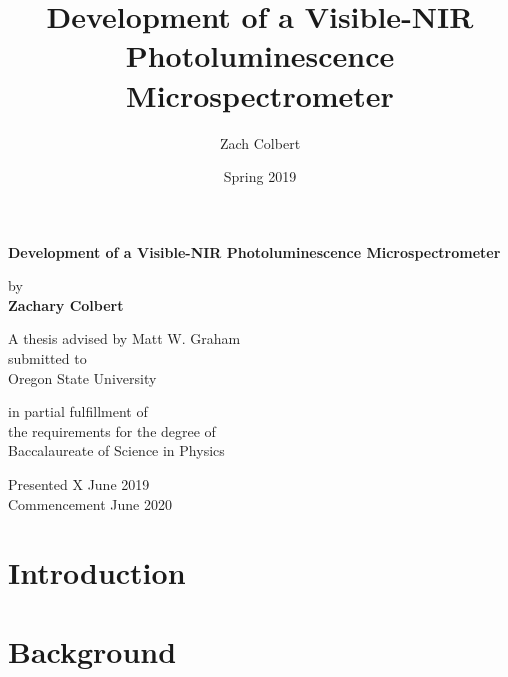 \documentclass{report}
\title{Development of a Visible-NIR Photoluminescence Microspectrometer}
\author{Zach Colbert}
\date{Spring 2019}
\renewenvironment{abstract}
 {%
  \global\setbox\abstractbox=\vtop\bgroup
  \begin{center}\bfseries\abstractname\end{center}%
 }
 {\par\egroup}
\begin{document}

  \begin{titlepage}
    \begin{center}
        \vspace*{1cm}
  
        \textbf{Development of a Visible-NIR Photoluminescence Microspectrometer}
  
        \vspace{1.5cm}
  
        by \\
        \textbf{Zachary Colbert}
  
        \vspace{5cm}
  
        A thesis advised by Matt W. Graham \\
        submitted to \\
        Oregon State University

        \vspace{1.5cm}

        in partial fulfillment of \\
        the requirements for the degree of \\
        Baccalaureate of Science in Physics
  
        \vfill
  
        Presented X June 2019 \\
        Commencement June 2020
  
    \end{center}
  \end{titlepage}

  

  \tableofcontents
  \listoffigures


  \chapter{Introduction}
  

  \chapter{Background}
  
\end{document}
